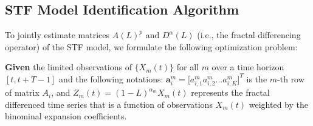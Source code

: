 \subsection{STF Model Identification Algorithm}
To jointly estimate matrices $A(L)^p$ and $D^{\alpha}(L)$ (i.e., the fractal differencing operator) of the STF model, we formulate the following optimization problem: 

\textbf{Given} the limited observations of $\{X_{m}(t)\}$ for all $m$ over a time horizon $[t,t+T-1]$ and the following notations: $\textbf{a}_{i}^{m}=[a^{m}_{i,1} a^{m}_{i,2}$...$a^{m}_{i,K}]^{T}$ is the $m$-th row of matrix $A_{i}$, and $Z_{m}(t)=(1-L)^{\alpha_{m}}X_{m}(t)$ represents the fractal differenced time series that is a function of observations $X_m(t)$ weighted by the binominal expansion coefficients.

